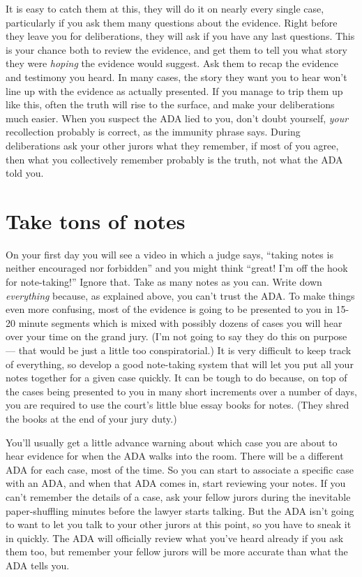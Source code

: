 \documentclass[letterpaper]{article}
\begin{document}
It is easy to catch them at this, they will do it on nearly every single case, particularly if you ask them many questions about the evidence.
Right before they leave you for deliberations, they will ask if you have any last questions. 
This is your chance both to review the evidence, and get them to tell you what story they were \emph{hoping} the evidence would suggest.
Ask them to recap the evidence and testimony you heard.
In many cases, the story they want you to hear won't line up with the evidence as actually presented. 
If you manage to trip them up like this, often the truth will rise to the surface, and make your deliberations much easier.
When you suspect the ADA lied to you, don't doubt yourself, \emph{your} recollection probably is correct, as the immunity phrase says.
During deliberations ask your other jurors what they remember, if most of you agree, then what you collectively remember probably is the truth, not what the ADA told you. 

\section*{Take tons of notes}
On your first day you will see a video in which a judge says, ``taking notes is neither encouraged nor forbidden'' and you might think ``great! I'm off the hook for note-taking!''
Ignore that. Take as many notes as you can. 
Write down \emph{everything} because, as explained above, you can't trust the ADA. 
To make things even more confusing, most of the evidence is going to be presented to you in 15-20 minute segments which is mixed with possibly dozens of cases you will hear over your time on the grand jury. 
(I'm not going to say they do this on purpose --- that would be just a little too conspiratorial.)
It is very difficult to keep track of everything, so develop a good note-taking system that will let you put all your notes together for a given case quickly.
It can be tough to do because, on top of the cases being presented to you in many short increments over a number of days, you are required to use the court's little blue essay books for notes.
(They shred the books at the end of your jury duty.)

You'll usually get a little advance warning about which case you are about to hear evidence for when the ADA walks into the room.
There will be a different ADA for each case, most of the time. 
So you can start to associate a specific case with an ADA, and when that ADA comes in, start reviewing your notes.
If you can't remember the details of a case, ask your fellow jurors during the inevitable paper-shuffling minutes before the lawyer starts talking.
But the ADA isn't going to want to let you talk to your other jurors at this point, so you have to sneak it in quickly.
The ADA will officially review what you've heard already if you ask them too, but remember your fellow jurors will be more accurate than what the ADA tells you.
\end{document}
